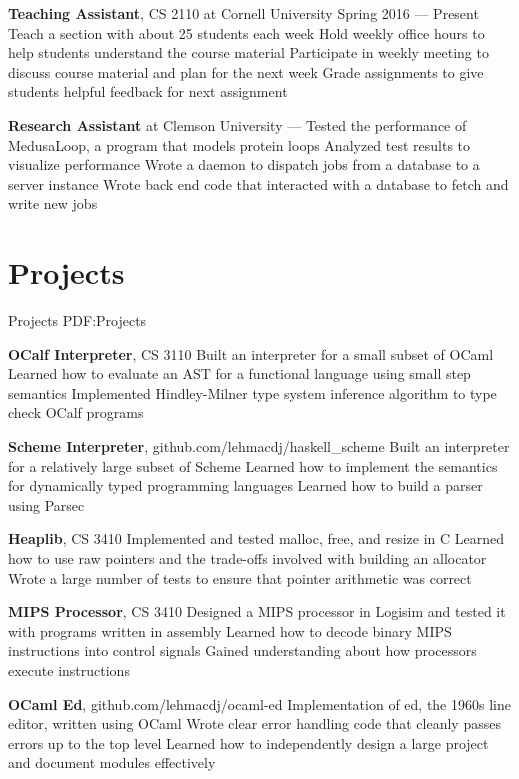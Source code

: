 \documentclass[letterpaper,10pt,oneside]{simpleresume}
\begin{document}
\begin{minipage}[t][0pt]{\linewidth}
\begin{body}
\textbf{Teaching Assistant}, CS 2110 at Cornell University
\hfill
Spring 2016 --- Present
\BulletItem%
Teach a section with about 25 students each week
\BulletItem%
Hold weekly office hours to help students understand the course material
\BulletItem%
Participate in weekly meeting to discuss course material and plan for the next
week
\BulletItem%
Grade assignments to give students helpful feedback for next assignment
\GapNoBreak%

\textbf{Research Assistant} at Clemson University
\hfill
{} --- 
\BulletItem%
Tested the performance of MedusaLoop, a program that models protein loops
\BulletItem%
Analyzed test results to visualize performance
\BulletItem%
Wrote a daemon to dispatch jobs from a database to a server instance
\BulletItem%
Wrote back end code that interacted with a database to fetch and write new jobs

\section%
{Projects}
{Projects}
{PDF:Projects}

\textbf{OCalf Interpreter}, CS 3110
\BulletItem%
Built an interpreter for a small subset of OCaml
\BulletItem%
Learned how to evaluate an AST for a functional language using small step
semantics
\BulletItem%
Implemented Hindley-Milner type system inference algorithm to type check
OCalf programs
\GapNoBreak%

\textbf{Scheme Interpreter}, github.com/lehmacdj/haskell\_scheme
\BulletItem%
Built an interpreter for a relatively large subset of Scheme
\BulletItem%
Learned how to implement the semantics for dynamically typed programming
languages
\BulletItem%
Learned how to build a parser using Parsec
\GapNoBreak%

\textbf{Heaplib}, CS 3410
\BulletItem%
Implemented and tested malloc, free, and resize in C
\BulletItem%
Learned how to use raw pointers and the trade-offs involved with building
an allocator
\BulletItem%
Wrote a large number of tests to ensure that pointer arithmetic was correct
\GapNoBreak%

\textbf{MIPS Processor}, CS 3410
\BulletItem%
Designed a MIPS processor in Logisim and tested it with programs written in
assembly
\BulletItem%
Learned how to decode binary MIPS instructions into control signals
\BulletItem%
Gained understanding about how processors execute instructions
\GapNoBreak%

\textbf{OCaml Ed}, github.com/lehmacdj/ocaml-ed
\BulletItem%
Implementation of ed, the 1960s line editor, written using OCaml
\BulletItem%
Wrote clear error handling code that cleanly passes errors up to the top level
\BulletItem%
Learned how to independently design a large project and document modules
effectively
\GapNoBreak%


\end{body}
\end{minipage}
\end{document}
